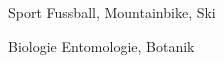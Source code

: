 

\begin{cvpairs}

  
\cvpair
    {Sport} %
    {Fussball, Mountainbike, Ski} %


\cvpair
    {Biologie} %
    {Entomologie, Botanik} %

\end{cvpairs}
